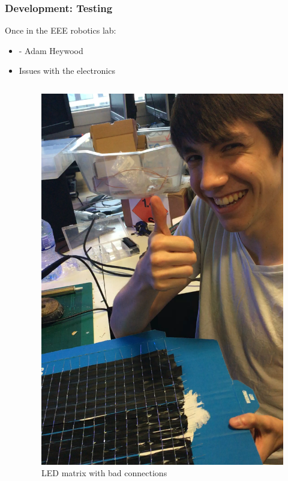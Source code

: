 \documentclass{beamer}
\begin{document}
\begin{frame}
\frametitle{Development: Testing}

Once in the EEE robotics lab:
\begin{itemize}
\item {} - Adam Heywood
\item Issues with the electronics
\end{itemize}

\begin{columns}

\begin{column}{0.05\textwidth}
\end{column}

\begin{column}{0.4\textwidth}
\begin{figure}
	\includegraphics[scale=0.1]{images/bad_connections.png}
	\caption{LED matrix with bad connections}
\end{figure}
\end{column}



\end{columns}
\end{frame}
\end{document}
